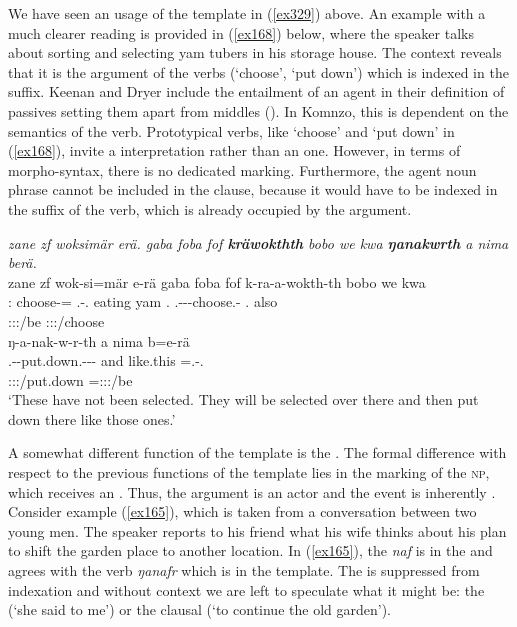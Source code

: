 We have seen an  usage of the  template in (\ref{ex329}) above. An example with a much clearer  reading is provided in (\ref{ex168}) below, where the speaker talks about sorting and selecting yam tubers in his storage house. The context reveals that it is the  argument of the verbs (`choose', `put down') which is indexed in the suffix. Keenan and Dryer include the entailment of an agent in their definition of passives setting them apart from middles (\citeyear[352]{Keenan:2007passives}). In Komnzo, this is dependent on the semantics of the verb. Prototypical  verbs, like `choose' and `put down' in (\ref{ex168}), invite a  interpretation rather than an  one. However, in terms of morpho-syntax, there is no dedicated  marking. Furthermore, the agent noun phrase cannot be included in the clause, because it would have to be indexed in the suffix of the verb, which is already occupied by the  argument.

\begin{exe}
	\ex \emph{zane zf woksimär erä. gaba foba fof \textbf{kräwokthth} bobo we kwa \textbf{ŋanakwrth} a nima berä.}\\
	\glll zane zf wok-si=mär e-rä gaba foba fof k-ra-a-wokth-th bobo we kwa\\
	\Dem:\Prox{} \Imm{} choose-\Nmlz=\Priv{} \Stnsg.\Alph-\Cop.\Ndu{} {eating yam} \Dist.\Abl{} \Emph{} \M.\Bet{}-\Irr-\Vc\textbar\Ndu-choose.\Rs-\Stnsg{} \Med.\All{} also \Fut{}\\
	{} {} {} \footnotesize{\Stpl:\Sbj:\Nonpast:\Ipfv/be} {} {} {} \footnotesize{\Stpl:\Sbj:\Irr:\Pfv/choose} {} {} {}\\
	\sn
	\glll ŋ-a-nak-w-r-th a nima b=e-rä\\
	\M.\Alph-\Vc-put.down.\Ext-\Ndu-\Lk-\Stnsg{} and like.this \Med=\Stnsg.\Alph-\Cop.\Ndu{}\\
	\footnotesize{\Stpl:\Sbj:\Nonpast:\Ipfv/put.down} {} {} \footnotesize{\Med=\Stpl:\Sbj:\Nonpast:\Ipfv/be}\\
	\trans `These have not been selected. They will be selected over there and then put down there like those ones.'
	\label{ex168}
\end{exe}

A somewhat different function of the  template is the  . The formal difference with respect to the previous functions of the  template lies in the marking of the \textsc{np}, which receives an . Thus, the argument is an actor and the event is inherently . Consider example (\ref{ex165}), which is taken from a conversation between two young men. The speaker reports to his friend what his wife thinks about his plan to shift the garden place to another location. In (\ref{ex165}), the  \emph{naf} is in the   and agrees with the verb \emph{ŋanafr} which is in the  template. The  is suppressed from indexation and without context we are left to speculate what it might be: the  (`she said to me') or the clausal  (`to continue the old garden').

